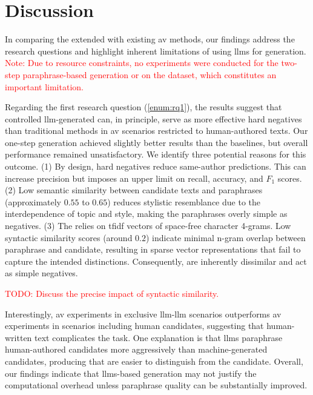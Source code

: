 \chapter{Discussion}
\label{chap:discussion}
In comparing the extended \impAppr{} with existing \ac{av} methods, our findings address the research questions and highlight inherent limitations of using \acp{llm} for \imp{} generation. 
\textcolor{red}{Note: Due to resource constraints, no experiments were conducted for the two-step paraphrase-based \imp{} generation or on the \dataPan{} dataset, which constitutes an important limitation.}

Regarding the first research question (\autoref{enum:rq1}), the results suggest that controlled \ac{llm}-generated \imps{} can, in principle, serve as more effective hard negatives than traditional methods in \ac{av} scenarios restricted to human-authored texts. 
Our one-step \imp{} generation achieved slightly better results than the baselines, but overall performance remained unsatisfactory. 
We identify three potential reasons for this outcome.
(1) By design, hard negatives reduce same-author predictions. 
This can increase precision but imposes an upper limit on recall, accuracy, and $F_1$ scores. 
(2) Low semantic similarity between candidate texts and paraphrases (approximately $0.55$ to $0.65$) reduces stylistic resemblance due to the interdependence of topic and style, making the paraphrases overly simple as negatives. 
(3) The \impAppr{} relies on \ac{tfidf} vectors of space-free character 4-grams. 
Low syntactic similarity scores (around $0.2$) indicate minimal n-gram overlap between paraphrase and candidate, resulting in sparse vector representations that fail to capture the intended distinctions.
Consequently, \imps{} are inherently dissimilar and act as simple negatives. 

\textcolor{red}{TODO: Discuss the precise impact of syntactic similarity.}

Interestingly, \ac{av} experiments in exclusive \ac{llm}-\ac{llm} scenarios outperforms \ac{av} experiments in scenarios including human candidates, suggesting that human-written text complicates the task. 
One explanation is that \acp{llm} paraphrase human-authored candidates more aggressively than machine-gen\-erated candidates, producing \imps{} that are easier to distinguish from the candidate. 
Overall, our findings indicate that \acp{llm}-based \imp{} generation may not justify the computational overhead unless paraphrase quality can be substantially improved.

